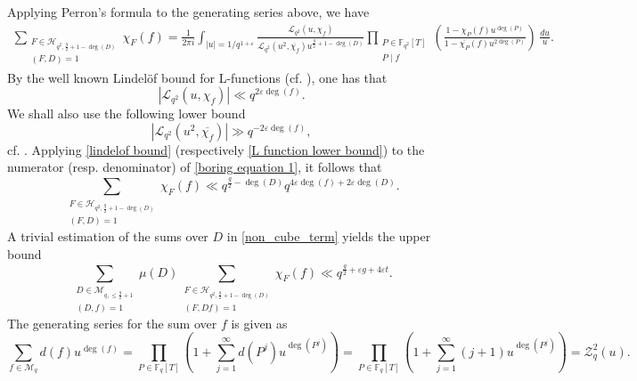 \documentclass[table]{amsart}
\numberwithin{equation}{section}
\begin{document}
\noindent Applying Perron's formula to the generating series above, we have
\begin{equation}\label{boring equation 1}
\begin{split}
 \sum_{\substack{F \in \mathcal{H}_{q^2,\frac{g}{2}+1-\deg(D)} \\ (F,D)=1}} \chi_F(f) = \frac{1}{2 \pi i} \int_{|u|=1/q^{1+\varepsilon}} \frac{ \mathcal{L}_{q^2} \left(u,\chi_f\right) }{\mathcal{L}_{q^2}(u^2, \overline{\chi_f}) u^{\frac{g}{2}+1-\deg(D)}} \prod_{\substack{P \in \mathbb{F}_{q^2}[T] \\ P \mid f}} \left(\frac{  1- \chi_P(f) u^{\deg(P)} }{   1- \overline{\chi_P}(f) u^{2 \deg(P)} } \right)\, \frac{du}{u}.
\end{split}
\end{equation}
By the well known Lindel\"of bound for L-functions (cf. \cite[Lemma 2.5]{DFLCubic}), one has that 
\begin{equation}\label{lindelof bound}
    \left|  \mathcal{L}_{q^2} \left(u,\chi_f\right) \right| \ll q^{2 \varepsilon \deg(f)}.
\end{equation}
We shall also use the following lower bound
\begin{equation}\label{L function lower bound}  \left| \mathcal{L}_{q^2} (u^2, \overline{\chi_f})  \right| \gg q^{-2 \varepsilon\deg(f)},\end{equation}
cf. \cite[Lemma 2.6]{DFLCubic}. Applying \eqref{lindelof bound} (respectively \eqref{L function lower bound}) to the numerator (resp. denominator) of \eqref{boring equation 1}, it follows that
$$  \sum_{\substack{F \in \mathcal{H}_{q^2,\frac{g}{2}+1-\deg(D)} \\ (F,D)=1}} \chi_F(f) \ll q^{\frac{g}{2}-\deg(D)} q^{4 \varepsilon \deg(f)+2 \varepsilon \deg(D)}.$$
\noindent A trivial estimation of the sums over $D$ in \eqref{non_cube_term} yields the upper bound
\begin{equation*}
\sum_{\substack{D \in \mathcal{M}_{q, \leq \frac{g}{2}+1} \\ (D,f)=1}} \mu(D) \sum_{\substack{F \in \mathcal{H}_{q^2,\frac{g}{2}+1-\deg(D)} \\ (F,Df)=1}} \chi_F(f)\ll q^{\frac{g}{2}+\varepsilon g+4 \varepsilon t}.
\end{equation*}
\noindent The generating series for the sum over $f$ is given as
\[\sum_{{f \in \mathcal{M}_{q} }}{d(f)}u^{\deg(f)}=\prod_{P\in \mathbb{F}_{q}[T]}\left(1+\sum_{j=1}^{\infty}d(P^{j})u^{\deg(P^j)}\right)=\prod_{P\in \mathbb{F}_{q}[T]}\left(1+\sum_{j=1}^{\infty}(j+1)u^{\deg(P^j)}\right)= \mathcal{Z}_{q}^2{(u)}.\]
\end{document}
